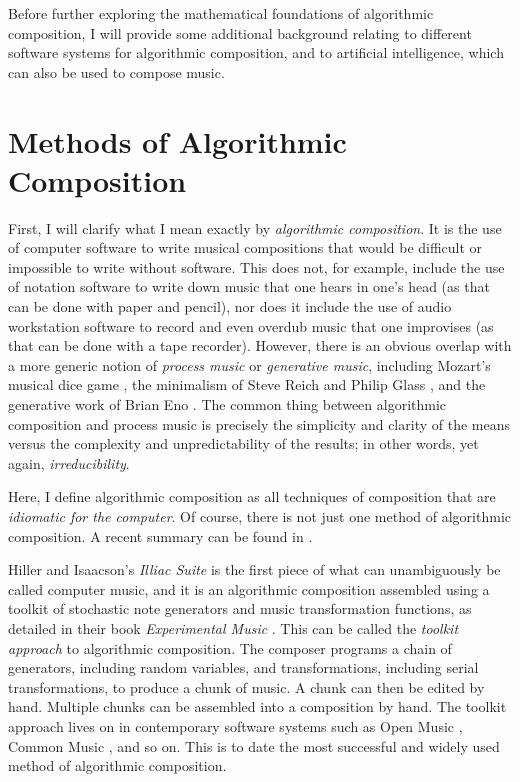 \documentclass[11pt]{amsart}
\begin{document}
Before further exploring the mathematical foundations of algorithmic composition, I will provide some additional background relating to different software systems for algorithmic composition, and to artificial intelligence, which can also be used to compose music.

\section{Methods of Algorithmic Composition}

First, I will clarify what I mean exactly by \emph{algorithmic composition}. It is the use of computer software to write musical compositions that would be difficult or impossible to write without software. This does not, for example, include the use of notation software to write down music that one hears in one's head (as that can be done with paper and pencil), nor does it include the use of audio workstation software to record and even overdub music that one improvises (as that can be done with a tape recorder). However, there is an obvious overlap with a more generic notion of \emph{process music} or \emph{generative music}, including Mozart's musical dice game \cite{humdrumdice}, the minimalism of Steve Reich \cite{reichprocess, 10.2307/832600} and Philip Glass \cite{potter2002four, glass2015words}, and the generative work of Brian Eno \cite{eno1996generative}. The common thing between algorithmic composition and process music is precisely the simplicity and clarity of the means versus the complexity and unpredictability of the results; in other words, yet again, \emph{irreducibility}. 

Here, I define algorithmic composition as all techniques of composition that are \emph{idiomatic for the computer}. Of course, there is not just one method of algorithmic composition. A recent summary can be found in \cite{mclean2018oxford}.

Hiller and Isaacson's \emph{Illiac Suite} \cite{illiacsuite} is the first piece of what can unambiguously be called computer music, and it is an algorithmic composition assembled using a toolkit of stochastic note generators and music transformation functions, as detailed in their book \emph{Experimental Music} \cite{hiller}. This can be called the \emph{toolkit approach} to algorithmic composition. The composer programs a chain of generators, including random variables, and transformations, including serial transformations, to produce a chunk of music. A chunk can then be edited by hand. Multiple chunks can be assembled into a composition by hand. The toolkit approach lives on in contemporary software systems such as Open Music \cite{OpenMusic}, Common Music \cite{musx}, and so on. This is to date the most successful and widely used method of algorithmic composition.
\end{document}
